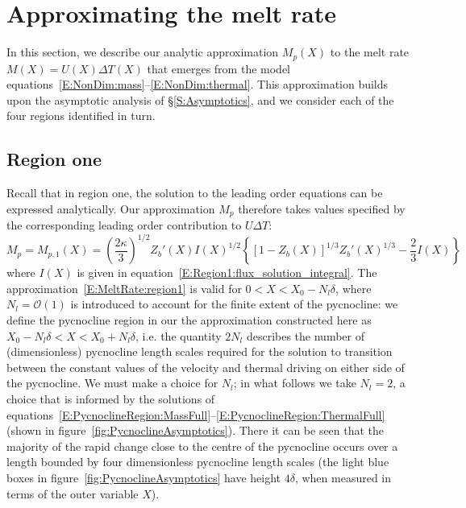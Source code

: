 \documentclass[openacc]{rsproca_new}%
\newcommand{\order}[1]{\mathcal{O}(#1)}
\newcommand{\lt}{\delta} %
\begin{document}
\section{Approximating the melt rate}\label{S:MeltRate}
In this section, we describe our analytic approximation $M_p(X)$ to the melt rate $M(X) = U(X)\Delta T(X)$ that emerges from the model equations~\eqref{E:NonDim:mass}--\eqref{E:NonDim:thermal}. This approximation builds upon the asymptotic analysis of \S\ref{S:Asymptotics}, and we consider each of the four regions identified in turn.

\subsection{Region one}
Recall that in region one, the solution to the leading order equations can be expressed analytically. Our approximation $M_p$ therefore takes values specified by the corresponding leading order contribution to $U\Delta T$:
\begin{equation}\label{E:MeltRate:region1}
M_{p} = M_{p,1}(X) = \left(\frac{2\kappa}{3}\right)^{1/2}Z_b'(X)I(X)^{1/2}\left\{\left[1 - Z_b(X)\right]^{1/3}Z_b'(X)^{1/3} - \frac{2}{3}I(X) \right\} %
\end{equation}
where $I(X)$ is given in equation~\eqref{E:Region1:flux_solution_integral}. The approximation~\eqref{E:MeltRate:region1} is valid for $0 < X < X_0 - N_l \lt $, where $N_l = \order{1}$ is introduced to account for the finite extent of the pycnocline: we define the pycnocline region in our the approximation constructed here as $X_0 - N_l \lt < X < X_0 + N_l \lt$, i.e. the quantity $2 N_l$ describes the number of (dimensionless) pycnocline length scales required for the solution to transition between the constant values of the velocity and thermal driving on either side of the pycnocline.  We must make a choice for $N_l$; in what follows we take $N_l = 2$, a choice that is informed by the solutions of equations~\eqref{E:PycnoclineRegion:MassFull}--\eqref{E:PycnoclineRegion:ThermalFull} (shown in figure~\ref{fig:PycnoclineAsymptotics}). There it can be seen that the majority of the rapid change close to the centre of the pycnocline occurs over a length bounded by four dimensionless pycnocline length scales (the light blue boxes in figure~\ref{fig:PycnoclineAsymptotics} have height $4\lt$, when measured in terms of the outer variable $X$).
\end{document}
